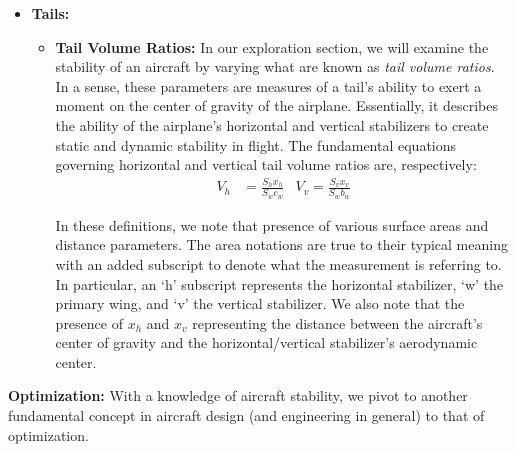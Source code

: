 \documentclass{report}
\begin{document}
\begin{itemize}
\begin{itemize}
            \item[] \textbf{Eigenvalues:} As expected from a dynamic systems course, the \textit{eigenvalues} of the system's state matrix dictate the dynamic stability of the aircraft.
    The eigenvalues typically have a real and complex part, corresponding to their stability and oscillation frequency respectively:
    \begin{equation}
    \lambda = \sigma + \omega i
    \end{equation}
    In our analysis, we primarily focus on the real portion of the eigenvalue, $\sigma$, as this tells us whether the oscillations will decay or amplify in time.
        \end{itemize}


    \item[] \textbf{Tails:}
        \begin{itemize}
            \item[] \textbf{Tail Volume Ratios:} In our exploration section, we will examine the stability of an aircraft by varying what are known as \textit{tail volume ratios}. In a sense, these parameters are measures of a tail's ability to exert a moment on the center of gravity of the airplane.
            Essentially, it describes the ability of the airplane's horizontal and vertical stabilizers to create static and dynamic stability in flight. The fundamental equations governing horizontal and vertical tail volume ratios are, respectively:
            \begin{align}
            V_h &= \frac{S_h x_h}{S_w c_w} &
            V_v = \frac{S_v x_v}{S_w b_w}
            \end{align}

            In these definitions, we note that presence of various surface areas and distance parameters. The area notations are true to their typical meaning with an added subscript to denote what the measurement is referring to.
            In particular, an `h' subscript represents the horizontal stabilizer, `w' the primary wing, and `v' the vertical stabilizer. We also note that the presence of $x_h$ and $x_v$ representing the distance between the aircraft's center of gravity and the horizontal/vertical stabilizer's aerodynamic center.

        \end{itemize}
\end{itemize}
\textbf{Optimization:} With a knowledge of aircraft stability, we pivot to another fundamental concept in aircraft design (and engineering in general) to that of optimization.
\end{document}
